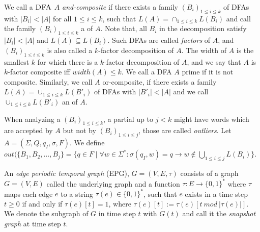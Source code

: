 We call a $\textsc{DFA}$ $A$ \textit{and-composite} if there exists a family $(B_i)_{1 \leq i \leq k}$ of DFAs with $|B_i| < |A|$ for all $1 \leq i \leq k$, such that $L(A) = \cap_{1\leq i \leq k} L(B_i)$ and call the family $(B_i)_{1\leq i \leq k}$ a \textit{\andDecomp} of $A$. Note that, all $B_i$ in the decomposition satisfy $|B_i| < |A|$ and $L(A) \subseteq L(B_i)$. Such DFAs are called \textit{factors} of $A$, and $(B_i)_{1\leq i \leq k}$ is also called a $k$-factor decomposition of $A$. The
width of $A$ is the smallest $k$ for which there is a $k$-factor decomposition of $A$, and we say that $A$ is $k$-factor composite iff $width(A) \leq k$. We call a DFA $A$ prime if it is not composite. Similarly, we call $A$ or-composite, if there exists a family $L(A) = \cup_{1\leq i \leq k} L(B'_i)$ of DFAs with $|B'_i| < |A|$ and we call $\cup_{1\leq i \leq k} L(B'_i)$ an \orDecomp of $A$.

When analyzing a \orDecomp $(B_i)_{1 \leq i \leq k}$, a partial \orDecomp up to $j < k$ might have words which are accepted by $A$ but not by $(B_i)_{1 \leq i \leq j}$, those are called \textit{outliers}. Let $A = (\Sigma, Q, q_I, \sigma, F)$. We define $out(\{B_1, B_2, \dots, B_j\} = \{q \in F \mid \forall w \in \Sigma^* \colon \sigma(q_I, w) = q \rightarrow w \notin \bigcup_{1\leq i \leq j} L(B_i)\}$.

An \textit{edge periodic temporal graph} (EPG), $G = (V, E, \tau)$ consists of a graph $G = (V, E)$ called the underlying graph and a function $\tau : E \rightarrow \{0, 1\}^*$ where $\tau$ maps each edge $e$ to a string $\tau(e) \in \{0, 1\}^*$, such that $e$ exists in a time step $t \geq 0$ if and only if $\tau(e)[t] = 1$, where $\tau(e)[t] := \tau(e)[t~ mod~ |\tau(e)|]$. We denote the subgraph of $G$ in time step $t$ with $G(t)$ and call it the \textit{snapshot graph} at time step $t$.

